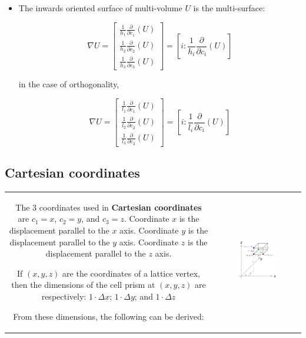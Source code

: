 \documentclass{book}
\begin{document}
\begin{itemize}

\item The inwards oriented surface of multi-volume \(U\) is the multi-surface:

\[\nabla U = \begin{bmatrix} \frac{1}{h_1}\frac{\partial}{\partial c_1}(U) \\ \frac{1}{h_2}\frac{\partial}{\partial c_2}(U) \\ \frac{1}{h_3}\frac{\partial}{\partial c_3}(U) \end{bmatrix} = \left[ i :  \frac{1}{h_i}\frac{\partial}{\partial c_i}(U)\right]\]

in the case of orthogonality, 

\[\nabla U = \begin{bmatrix} \frac{1}{l_1}\frac{\partial}{\partial c_1}(U) \\ \frac{1}{l_2}\frac{\partial}{\partial c_2}(U) \\ \frac{1}{l_3}\frac{\partial}{\partial c_3}(U) \end{bmatrix} = \left[ i :  \frac{1}{l_i}\frac{\partial}{\partial c_i}(U)\right]\]

\end{itemize} 




\subsection*{Cartesian coordinates} 

\begin{tabular}{cc}
\parbox{0.5\textwidth}{
The 3 coordinates used in {\bf Cartesian coordinates} are \(c_1 = x\), \(c_2 = y\), and \(c_3 = z\). Coordinate \(x\) is the displacement parallel to the \(x\) axis. Coordinate \(y\) is the displacement parallel to the \(y\) axis. Coordinate \(z\) is the displacement parallel to the \(z\) axis.

If \((x,y,z)\) are the coordinates of a lattice vertex, then the dimensions of the cell prism at \((x,y,z)\) are respectively:
\(1 \cdot \Delta x\); \(1 \cdot \Delta y\); and \(1 \cdot \Delta z\)

From these dimensions, the following can be derived:
} & \parbox{0.5\textwidth}{
\includegraphics[width = 0.5\textwidth]{Coordinate_systems/Cartesian_coordinates}
}
\end{tabular}
\end{document}
